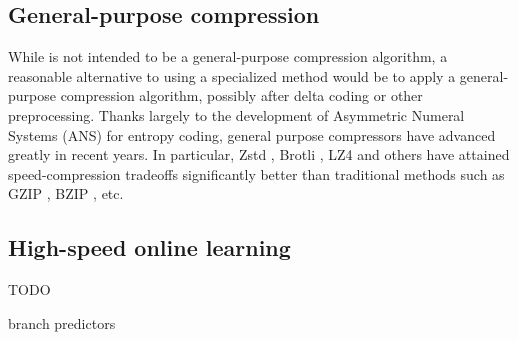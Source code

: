 \subsection{General-purpose compression}
While \minesp is not intended to be a general-purpose compression algorithm, a reasonable alternative to using a specialized method would be to apply a general-purpose compression algorithm, possibly after delta coding or other preprocessing. Thanks largely to the development of Asymmetric Numeral Systems (ANS) \cite{ans} for entropy coding, general purpose compressors have advanced greatly in recent years. In particular, Zstd \cite{zstd}, Brotli \cite{brotli}, LZ4 \cite{lz4} and others have attained speed-compression tradeoffs significantly better than traditional methods such as GZIP \cite{gzip}, BZIP \cite{lzo}, etc.

\subsection{High-speed online learning}

TODO

branch predictors
